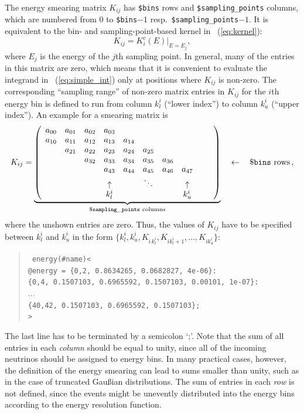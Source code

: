 The energy smearing matrix $K_{ij}$ has {\tt \$bins} rows and {\tt \$sampling\_points} columns, which are numbered from $0$ to {\tt \$bins}$-1$ resp.\ {\tt \$sampling\_points}$-1$. It is equivalent to the 
bin- and sampling-point-based kernel in \eq~(\ref{eq:kernel}):
\begin{equation}
K_{ij} = K_i^c(E) |_{E=E_j},
\label{equ:ematrix}
\end{equation}
where $E_j$ is the energy of the $j$th sampling point. In general, many of the entries in this matrix are zero, which means that it is convenient to evaluate the integrand in \eq~(\ref{eq:simple_int}) only at positions where
$K_{ij}$ is non-zero. The corresponding ``sampling range'' of non-zero matrix entries  in $K_{ij}$ for the $i$th energy bin is defined to run from
column $k_l^i$ (``lower index'') to column $k_u^i$ (``upper index'').
An example for a smearing matrix is
\begin{equation}
K_{ij} =   \underbrace{ \left( \begin{array}{cccccccccc} 
a_{00} & a_{01} & a_{02} & a_{03} &  &  &  &  &  & \\
a_{10} & a_{11} & a_{12} & a_{13} & a_{14} &  &  &  &  &  \\
 & a_{21} & a_{22} & a_{23} & a_{24} & a_{25} &  &  &  &  \\
 &  & a_{32} & a_{33} & a_{34} & a_{35} & a_{36} &  &  &  \\
 &  &  & a_{43} & a_{44} & a_{45} & a_{46} & a_{47} &  &  \\
& & & \uparrow  & & \ddots & & \uparrow & & \\
& & & k_l^i & & & & k_u^i & & \\ 
\end{array}\right) }_{\mathtt{\$sampling\_points}  \, \, \mathrm{columns}} \quad \leftarrow \quad \footnotesize{\mathtt{\$bins} \, \, \mathrm{rows}} \, ,
\end{equation}
where the unshown entries are zero. Thus, the values of $K_{ij}$ have to be specified between $k_l^i$ and $k_u^i$ in the form $\{ k_l^i,k_u^i, K_{i \, k_l^i}, K_{i k_l^i+1} , \hdots , K_{i k_u^i} \}$:
\begin{quote}
{\tt 
energy(\#name)<\\
\tb @energy =   \{0,2, 0.8634265, 0.0682827,     4e-06\}:\\
\tb\tb \{0,4, 0.1507103, 0.6965592, 0.1507103,   0.00101,     1e-07\}:\\
\tb\tb $\ldots$\\
\tb\tb \{40,42, 0.1507103, 0.6965592, 0.1507103\};\\
>
}
\end{quote}
The last line has to be terminated by a semicolon `;'.
Note that the sum of all entries in each {\em column} should be equal 
to unity,
since all of the incoming neutrinos should be assigned to energy bins. In many practical cases, however, the definition of the energy smearing can
lead to sums smaller than unity, such as in the case of truncated Gau\ss ian
distributions. The sum of entries in each {\em row} is not defined, since the events might be unevently distributed into the energy bins
according to the energy resolution function.


